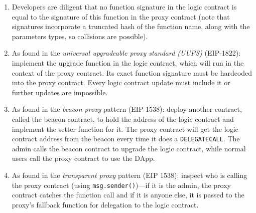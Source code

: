 \begin{enumerate}


\item Developers are diligent that no function signature in the logic contract is equal to the signature of this function in the proxy contract (note that signatures incorporate a truncated hash of the function name, along with the parameters types, so collisions are possible). 

\item As found in the \emph{universal upgradeable proxy standard (UUPS)} (EIP-1822): implement the upgrade function in the logic contract, which will run in the context of the proxy contract. Its exact function signature must be hardcoded into the proxy contract. Every logic contract update must include it or further updates are impossible.

\item As found in the \textit{beacon proxy} pattern (EIP-1538): deploy another contract, called the beacon contract, to hold the address of the logic contract and implement the setter function for it. The proxy contract will get the logic contract address from the beacon every time it does a \texttt{DELEGATECALL}. The admin calls the beacon contract to upgrade the logic contract, while normal users call the proxy contract to use the DApp. 

\item As found in the \textit{transparent proxy} pattern (EIP 1538): inspect who is calling the proxy contract (using \texttt{msg.sender()})---if it is the admin, the proxy contract catches the function call and if it is anyone else, it is passed to the proxy's fallback function for delegation to the logic contract. 

\end{enumerate}


